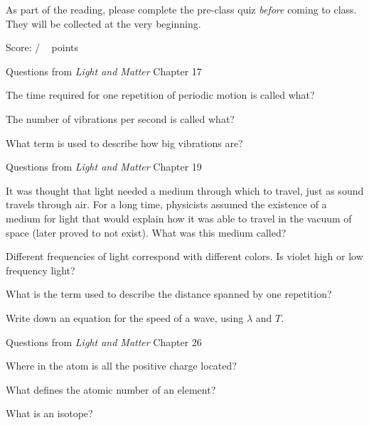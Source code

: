 \documentclass[addpoints,12pt]{exam}
\begin{document}
As part of the reading, please complete the pre-class quiz \textit{before} coming to class. They will be collected at the very beginning.
 
\clearpage

\begin{flushright}
Score: \hspace{0.2in} / \numpoints ~ points
\end{flushright}

\noindent Questions from \textit{Light and Matter} Chapter 17

\begin{questions}

\question[1]
The time required for one repetition of periodic motion is called what?
\fillwithlines{0.5in}

\question[1]
The number of vibrations per second is called what?
\fillwithlines{0.5in}

\question[1]
What term is used to describe how big vibrations are?
\fillwithlines{0.5in}


\end{questions}

\noindent Questions from \textit{Light and Matter} Chapter 19

\begin{questions}

\question[1]
It was thought that light needed a medium through which to travel, just as sound travels through air. For a long time, physicists assumed the existence of a medium for light that would explain how it was able to travel in the vacuum of space (later proved to not exist). What was this medium called?
\fillwithlines{0.5in}

\question[1]
Different frequencies of light correspond with different colors. Is violet high or low frequency light?
\fillwithlines{0.5in}

\question[1]
What is the term used to describe the distance spanned by one repetition?
\fillwithlines{0.5in}

\question[1]
Write down an equation for the speed of a wave, using $\lambda$ and $T$.
\fillwithlines{0.5in}

\end{questions}

\noindent Questions from \textit{Light and Matter} Chapter 26

\begin{questions}

\question[1]
Where in the atom is all the positive charge located?
\fillwithlines{0.5in}

\question[1]
What defines the atomic number of an element?
\fillwithlines{0.5in}

\question[1]
What is an isotope?
\fillwithlines{0.5in}

\end{questions}
\end{document}
